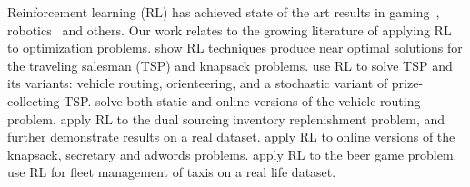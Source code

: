 \documentclass[letterpaper]{article} %
\begin{document}
Reinforcement learning (RL) has achieved state of the art results in gaming~\cite{silver2017mastering}, robotics~\cite{andrychowicz2018learning} and others. %
Our work relates to the growing literature of applying RL to optimization problems. \cite{bello2016neural} show RL techniques produce near optimal solutions for the traveling salesman (TSP) and knapsack problems. \cite{kool2018attention} use RL to solve TSP and its variants: vehicle routing, orienteering, and a stochastic variant of prize-collecting TSP. \cite{nazari2018reinforcement} solve both static and online versions of the vehicle routing problem. \cite{gijsbrechts2018can} apply RL to the dual sourcing inventory replenishment problem, and further demonstrate results on a real dataset. \cite{kong2018new} apply RL to online versions of the knapsack, secretary and adwords problems. \cite{oroojlooyjadid2017deep} apply RL to the beer game problem. \cite{lin2018efficient} use RL for fleet management of taxis on a real life dataset. 

\end{document}
